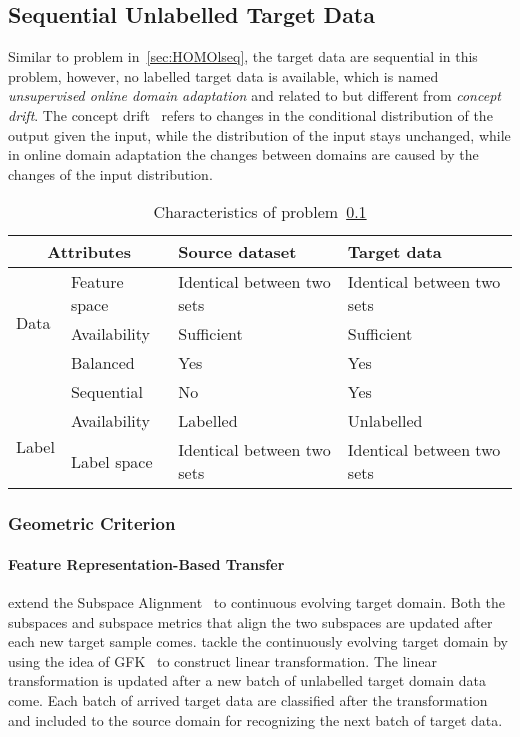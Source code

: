 \documentclass[prodmode]{acmsmall}  %
\begin{document}
\subsection{Sequential Unlabelled Target Data}
\label{sec:HOMOseq}
Similar to problem in~\ref{sec:HOMOlseq}, the target data are sequential in this problem, however, no labelled target data is available, which is named \textit{unsupervised online domain adaptation} and related to but different from \textit{concept drift}. The concept drift~\cite{Gama2014} refers to changes in the conditional distribution of the output given the input, while the distribution of the input stays unchanged, while in online domain adaptation the changes between domains are caused by the changes of the input distribution.
\begin{table}[htbp!]
\caption{Characteristics of problem~\ref{sec:HOMOseq}}
\label{tab:HOMOseq}
\begin{center}
\begin{small}
\begin{tabular}{|p{1cm}<{\centering}|m{2.5cm}<{\centering}|m{4.3cm}<{\centering}|m{4.3cm}<{\centering}|}
\hline
\multicolumn{2}{|c|}{Attributes} & Source dataset & Target data \\
\hline \hline
\multirow{3}{*}{Data} & Feature space & Identical between two sets & Identical between two sets \\ 
\cline{2-4}{} & Availability & Sufficient & Sufficient  \\
\cline{2-4}{} & Balanced & Yes & Yes \\
\cline{2-4}{} & Sequential & No & {\color{red}Yes} \\
\hline \hline
\multirow{2}{*}{Label} & Availability & Labelled & {\color{red}Unlabelled} \\
\cline{2-4}{}  & Label space & Identical between two sets & Identical between two sets \\ 
\hline
\end{tabular}
\end{small}
\end{center}
\end{table}
\subsubsection{Geometric Criterion}
\paragraph{Feature Representation-Based Transfer}  
 extend the Subspace Alignment~\cite{Fernando2013} to continuous evolving target domain. Both the subspaces and subspace metrics that align the two subspaces are updated after each new target sample comes.  tackle the continuously evolving target domain by using the idea of GFK~\cite{Gong2012} to construct linear transformation. The linear transformation is updated after a new batch of unlabelled target domain data come. Each batch of arrived target data are classified after the transformation and included to the source domain for recognizing the next batch of target data. 
\end{document}

